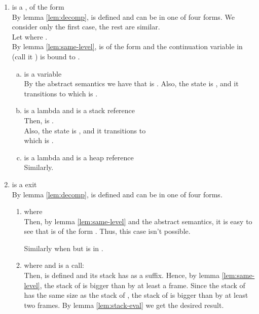 \documentclass{LMCS}
\theoremstyle{definition} \newtheorem{property}[thm]{Property}
\begin{document}
\begin{enumerate}[(1)]
\item \label{lem:stack-irrel,case:ueval}
  \astatnmo{} is a \daueval{}, of the form  \\
  By lemma \ref{lem:decomp}, \coren{\astatnmo} is defined and  can be in 
  one of four forms.
  We consider only the first case, the rest are similar. \\
  Let  
  where . \\
  By lemma \ref{lem:same-level}, \stenv{} is of the form
   and the continuation variable in \tfenv{} (call it )
  is bound to \acarg.
  \begin{enumerate}[(a)]
  \item 
     is a variable \\
    By the abstract semantics we have that
     is .
    Also, the state  is 
    ,
    and it transitions to
     which is .
  \item
     is a lambda and  is a stack reference \\
    Then,  is 
    .\\
    Also, the state  is 
    ,
    and it transitions to \\
     
    which is .
  \item
     is a lambda and  is a heap reference \\
    Similarly.
  \end{enumerate}
\item
  \astatnmo{} is a \daceval{} exit \\
  By lemma \ref{lem:decomp}, \coren{\astatnmo} is defined and  can be in 
  one of four forms.
  \begin{enumerate}
  \item 
     where
     \\
    Then, by lemma \ref{lem:same-level} and the abstract semantics,
    it is easy to see that  is of the form
    .
    Thus, this case isn't possible.

    Similarly when  
    but is in \corens{\astatnmo}.
  \item
     where  and  is a call: \\
    Then,  is defined and its stack has  as a suffix.
    Hence, by lemma \ref{lem:same-level}, the stack of  is bigger than
     by at least a frame.
    Since the stack of  has the same size as the stack of ,
    the stack of \astatnmo{} is bigger than  by at least two frames.
    By lemma \ref{lem:stack-eval} we get the desired result.


\end{enumerate}
\end{enumerate}
\end{document}
